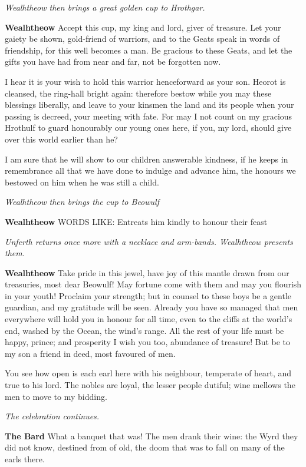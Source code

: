 \documentclass[a4paper]{article}
\begin{document}
{\centerline{\textit{Wealhtheow then brings a great golden cup to Hrothgar.}}

\textbf{Wealhtheow} Accept this cup, my king and lord,
giver of treasure. Let your gaiety be shown,
gold-friend of warriors, and to the Geats speak
in words of friendship, for this well becomes a man.
Be gracious to these Geats, and let the gifts you have had
from near and far, not be forgotten now.

I hear it is your wish to hold this warrior
henceforward as your son. Heorot is cleansed,
the ring-hall bright again: therefore bestow while you may
these blessings liberally, and leave to your kinsmen
the land and its people when your passing is decreed,
your meeting with fate. For may I not count
on my gracious Hrothulf to guard honourably
our young ones here, if you, my lord,
should give over this world earlier than he?

I am sure that he will show to our children
answerable kindness, if he keeps in remembrance
all that we have done to indulge and advance him,
the honours we bestowed on him when he was still a child.

\centerline{\textit{Wealhtheow then brings the cup to Beowulf}}

\textbf{Wealhtheow} WORDS LIKE: Entreats him kindly to honour their feast

\centerline{\textit{Unferth returns once more with a necklace and arm-bands. Wealhtheow presents them.}}

\textbf{Wealhtheow} Take pride in this jewel, have joy of this mantle
drawn from our treasuries, most dear Beowulf!
May fortune come with them and may you flourish in your youth!
Proclaim your strength; but in counsel to these boys
be a gentle guardian, and my gratitude will be seen.
Already you have so managed that men everywhere
will hold you in honour for all time,
even to the cliffs at the world’s end, washed by the Ocean,
the wind’s range. All the rest of your life
must be happy, prince; and prosperity I wish you too,
abundance of treasure! But be to my son
a friend in deed, most favoured of men.

You see how open is each earl here with his neighbour,
temperate of heart, and true to his lord.
The nobles are loyal, the lesser people dutiful;
wine mellows the men to move to my bidding.

\centerline{\textit{The celebration continues.}}

\textbf{The Bard} What a banquet that was!
The men drank their wine: the Wyrd they did not know,
destined from of old, the doom that was to fall
on many of the earls there.

}
\end{document}
